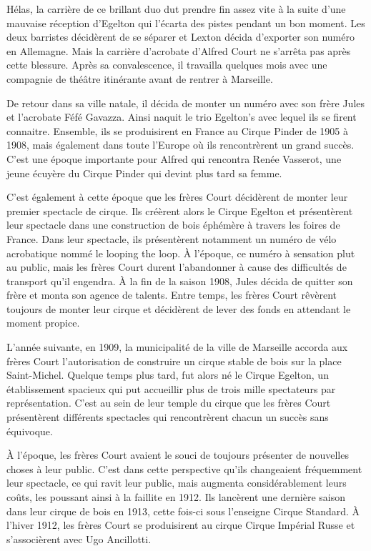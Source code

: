 Hélas, la carrière de ce brillant duo dut prendre fin assez vite à la suite d’une mauvaise réception d’Egelton qui l’écarta des pistes pendant un bon moment. Les deux barristes décidèrent de se séparer et Lexton décida d’exporter son numéro en Allemagne. Mais la carrière d’acrobate d’Alfred Court ne s’arrêta pas après cette blessure. Après sa convalescence, il travailla quelques mois avec une compagnie de théâtre itinérante avant de rentrer à Marseille. 

De retour dans sa ville natale, il décida de monter un numéro avec son frère Jules et l’acrobate Féfé Gavazza. Ainsi naquit le trio Egelton’s avec lequel ils se firent connaitre. Ensemble, ils se produisirent en France au Cirque Pinder de 1905 à 1908, mais également dans toute l’Europe où ils rencontrèrent un grand succès. C’est une époque importante pour Alfred qui rencontra Renée Vasserot, une jeune écuyère du Cirque Pinder qui devint plus tard sa femme.

C’est également à cette époque que les frères Court décidèrent de monter leur premier spectacle de cirque. Ils créèrent alors le Cirque Egelton et présentèrent leur spectacle dans une construction de bois éphémère à travers les foires de France. Dans leur spectacle, ils présentèrent notamment un numéro de vélo acrobatique nommé le looping the loop. À l’époque, ce numéro à sensation plut au public, mais les frères Court durent l’abandonner à cause des difficultés de transport qu’il engendra. À la fin de la saison 1908, Jules décida de quitter son frère et monta son agence de talents. Entre temps, les frères Court rêvèrent toujours de monter leur cirque et décidèrent de lever des fonds en attendant le moment propice.

L’année suivante, en 1909, la municipalité de la ville de Marseille accorda aux frères Court l’autorisation de construire un cirque stable de bois sur la place Saint-Michel. Quelque temps plus tard, fut alors né le Cirque Egelton, un établissement spacieux qui put accueillir plus de trois mille spectateurs par représentation. C’est au sein de leur temple du cirque que les frères Court présentèrent différents spectacles qui rencontrèrent chacun un succès sans équivoque.

À l'époque, les frères Court avaient le souci de toujours présenter de nouvelles choses à leur public. C'est dans cette perspective qu'ils changeaient fréquemment leur spectacle, ce qui ravit leur public, mais augmenta considérablement leurs coûts, les poussant ainsi à la faillite en 1912. Ils lancèrent une dernière saison dans leur cirque de bois en 1913, cette fois-ci sous l’enseigne Cirque Standard. À l’hiver 1912, les frères Court se produisirent au cirque Cirque Impérial Russe et s’associèrent avec Ugo Ancillotti.

